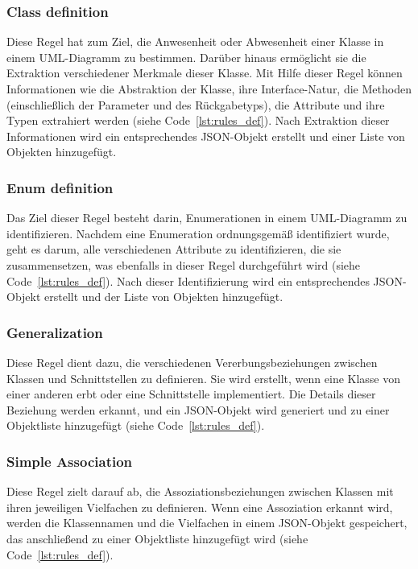 \subsubsection{Class definition}
Diese Regel hat zum Ziel, die Anwesenheit oder Abwesenheit einer Klasse in einem UML-Diagramm zu bestimmen. Darüber
hinaus ermöglicht sie die Extraktion verschiedener Merkmale dieser Klasse. Mit Hilfe dieser Regel können Informationen
wie die Abstraktion der Klasse, ihre Interface-Natur, die Methoden (einschließlich der Parameter und des Rückgabetyps),
die Attribute und ihre Typen extrahiert werden (siehe Code~\ref{lst:rules_def}). Nach Extraktion dieser Informationen wird
ein entsprechendes JSON-Objekt erstellt und einer Liste von Objekten hinzugefügt.

\subsubsection{Enum definition}
Das Ziel dieser Regel besteht darin, Enumerationen in einem UML-Diagramm zu identifizieren. Nachdem eine Enumeration
ordnungsgemäß identifiziert wurde, geht es darum, alle verschiedenen Attribute zu identifizieren, die sie zusammensetzen,
was ebenfalls in dieser Regel durchgeführt wird (siehe Code~\ref{lst:rules_def}). Nach dieser Identifizierung wird ein
entsprechendes JSON-Objekt erstellt und der Liste von Objekten hinzugefügt.

\subsubsection{Generalization}
Diese Regel dient dazu, die verschiedenen Vererbungsbeziehungen zwischen Klassen und Schnittstellen zu definieren.
Sie wird erstellt, wenn eine Klasse von einer anderen erbt oder eine Schnittstelle implementiert. Die Details dieser
Beziehung werden erkannt, und ein JSON-Objekt wird generiert und zu einer Objektliste hinzugefügt (siehe Code~\ref{lst:rules_def}).

\subsubsection{Simple Association}
Diese Regel zielt darauf ab, die Assoziationsbeziehungen zwischen Klassen mit ihren jeweiligen Vielfachen zu definieren.
Wenn eine Assoziation erkannt wird, werden die Klassennamen und die Vielfachen in einem JSON-Objekt gespeichert, das
anschließend zu einer Objektliste hinzugefügt wird (siehe Code~\ref{lst:rules_def}).

